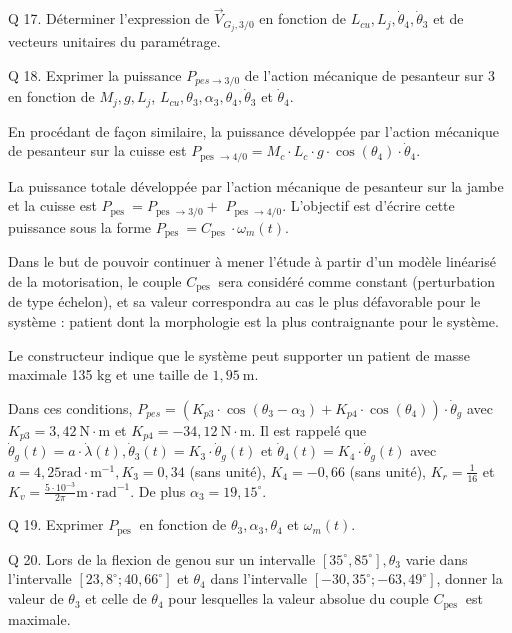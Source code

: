 \documentclass[10pt]{article}
\begin{document}
Q 17. Déterminer l'expression de $\vec{V}_{G_{j}, 3 / 0}$ en fonction de $L_{c u}, L_{j}, \dot{\theta}_{4}, \dot{\theta}_{3}$ et de vecteurs unitaires du paramétrage.

Q 18. Exprimer la puissance $P_{p e s \rightarrow 3 / 0}$ de l'action mécanique de pesanteur sur 3 en fonction de $M_{j}, g, L_{j}$, $L_{c u}, \theta_{3}, \alpha_{3}, \theta_{4}, \dot{\theta}_{3}$ et $\dot{\theta}_{4}$.

En procédant de façon similaire, la puissance développée par l'action mécanique de pesanteur sur la cuisse est $P_{\text {pes } \rightarrow 4 / 0}=M_{c} \cdot L_{c} \cdot g \cdot \cos \left(\theta_{4}\right) \cdot \dot{\theta}_{4}$.

La puissance totale développée par l'action mécanique de pesanteur sur la jambe et la cuisse est $P_{\text {pes }}=P_{\text {pes } \rightarrow 3 / 0}+$ $P_{\text {pes } \rightarrow 4 / 0}$. L'objectif est d'écrire cette puissance sous la forme $P_{\text {pes }}=C_{\text {pes }} \cdot \omega_{m}(t)$.

Dans le but de pouvoir continuer à mener l'étude à partir d'un modèle linéarisé de la motorisation, le couple $C_{\text {pes }}$ sera considéré comme constant (perturbation de type échelon), et sa valeur correspondra au cas le plus défavorable pour le système : patient dont la morphologie est la plus contraignante pour le système.

Le constructeur indique que le système peut supporter un patient de masse maximale 135 kg et une taille de $1,95 \mathrm{~m}$.

Dans ces conditions, $P_{p e s}=\left(K_{p 3} \cdot \cos \left(\theta_{3}-\alpha_{3}\right)+K_{p 4} \cdot \cos \left(\theta_{4}\right)\right) \cdot \dot{\theta}_{g}$ avec $K_{p 3}=3,42 \mathrm{~N} \cdot \mathrm{m}$ et $K_{p 4}=-34,12 \mathrm{~N} \cdot \mathrm{m}$. Il est rappelé que $\dot{\theta}_{g}(t)=a \cdot \dot{\lambda}(t), \dot{\theta}_{3}(t)=K_{3} \cdot \dot{\theta}_{g}(t)$ et $\dot{\theta}_{4}(t)=K_{4} \cdot \dot{\theta}_{g}(t)$ avec $a=4,25 \mathrm{rad} \cdot \mathrm{m}^{-1}, K_{3}=0,34$ (sans unité), $K_{4}=-0,66$ (sans unité), $K_{r}=\frac{1}{16}$ et $K_{v}=\frac{5 \cdot 10^{-3}}{2 \pi} \mathrm{m} \cdot \mathrm{rad}^{-1}$. De plus $\alpha_{3}=19,15^{\circ}$.

Q 19. Exprimer $P_{\text {pes }}$ en fonction de $\theta_{3}, \alpha_{3}, \theta_{4}$ et $\omega_{m}(t)$.

Q 20. Lors de la flexion de genou sur un intervalle $\left[35^{\circ}, 85^{\circ}\right], \theta_{3}$ varie dans l'intervalle $\left[23,8^{\circ} ; 40,66^{\circ}\right]$ et $\theta_{4}$ dans l'intervalle $\left[-30,35^{\circ} ;-63,49^{\circ}\right]$, donner la valeur de $\theta_{3}$ et celle de $\theta_{4}$ pour lesquelles la valeur absolue du couple $C_{\text {pes }}$ est maximale.
\end{document}

